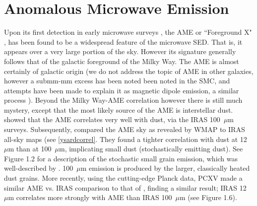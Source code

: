 \section{Anomalous Microwave Emission}
     Upon its first detection in early microwave surveys \citep{leitch97}, the AME or  ``Foreground X" \citep{deoliveiracosta02}, has been found to be a widespread feature of the microwave SED. That is, it appears over a very large portion of the sky. However its signature generally follows that of the galactic foreground of the Milky Way. The AME is almost certainly of galactic origin (we do not address the topic of AME in other galaxies, however a submm-mm excess has been noted been noted in the SMC, and attempts have been made to explain it as magnetic dipole emission, a similar process \citep{draine12}). Beyond the Milky Way-AME correlation however there is still much mystery, except that the most likely source of the AME is interstellar dust. \cite{kogut96,deoliveiracosta97,leitch98} showed that the AME correlates very well with dust, via the IRAS 100~$\mu$m surveys.
     Subsequently, \cite{ysard10b} compared the AME sky as revealed by WMAP \citep{wmap03a} to IRAS all-sky maps (see \ref{ysardcorrel}. They found a tighter correlation with dust at 12~$\mu$m than at 100~$\mu$m, implicating small dust (stochastically emitting dust). See Figure 1.2 for a description of the stochastic small grain emission, which was well-described by \cite{draine01}. 100~$\mu$m emission is produced by the larger, classically heated dust grains. More recently, using the cutting-edge Planck data, PCXV made a similar AME vs. IRAS comparison to that of \cite{ysard10a}, finding a similar result; IRAS 12~$\mu$m correlates more strongly with AME than IRAS 100~$\mu$m (see Figure 1.6).

